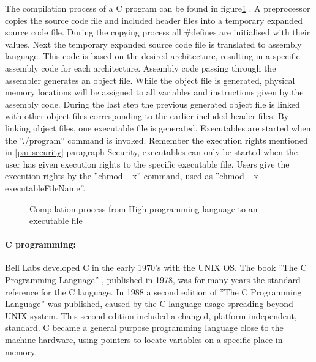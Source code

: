 \documentclass[12pt,a4paper,english,twoside,openright]{tutthesis}
\begin{document}
The compilation process of a C program can be found in figure\ref{fig:compilationProcess} \cite{CompilationLayout}. A preprocessor copies the source code file and included header files into a temporary expanded source code file. During the copying process all \#defines are initialised with their values. Next the temporary expanded source code file is translated to assembly language. This code is based on the desired architecture, resulting in a specific assembly code for each architecture. Assembly code passing through the assembler generates an object file. While the object file is generated, physical memory locations will be assigned to all variables and instructions given by the assembly code. During the last step the previous generated object file is linked with other object files corresponding to the earlier included header files. By linking object files, one executable file is generated. Executables are started when the ''./program'' command is invoked. Remember the execution rights mentioned in \ref{par:security} paragraph Security, executables can only be started when the user has given execution rights to the specific executable file. Users give the execution rights by the ''chmod +x'' command, used as ''chmod +x executableFileName''.
\begin{figure}\centering
	
	\caption{Compilation process from High programming language to an executable file \cite{CLanguage}}\label{fig:compilationProcess}
\end{figure}
				\paragraph{C programming:}
Bell Labs developed C in the early 1970's with the UNIX OS. The book ''The C Programming Language'' \cite{CLanguage}, published in 1978, was for many years the standard reference for the C language. In 1988 a second edition of ''The C Programming Language'' was published, caused by the C language usage spreading beyond UNIX system. This second edition included a changed, platform-independent, standard. C became a general purpose programming language close to the machine hardware, using pointers to locate variables on a specific place in memory.
\end{document}
